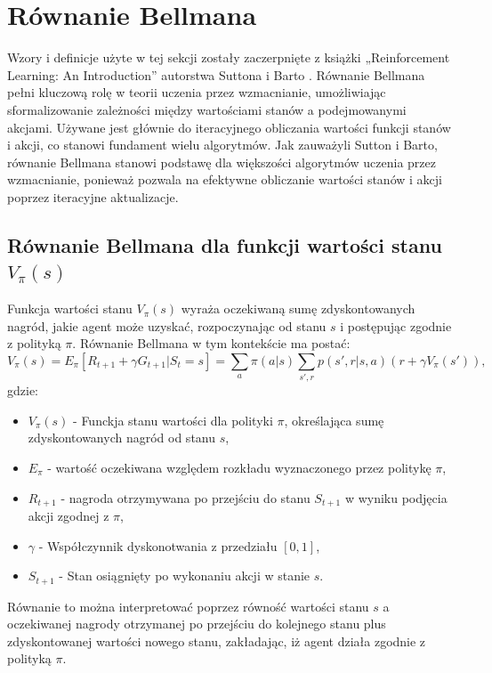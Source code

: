 \documentclass[a4paper, 12pt]{article}
\numberwithin{equation}{section}
\begin{document}
    \section{Równanie Bellmana}
    Wzory i definicje użyte w tej sekcji zostały zaczerpnięte z książki „Reinforcement Learning: An Introduction” autorstwa Suttona i Barto \cite{sutton2018rl}.
    Równanie Bellmana pełni kluczową rolę w teorii uczenia przez wzmacnianie, umożliwiając sformalizowanie zależności między wartościami stanów a podejmowanymi akcjami.
    Używane jest głównie do iteracyjnego obliczania wartości funkcji stanów i akcji, co stanowi fundament wielu algorytmów. 
    Jak zauważyli Sutton i Barto, równanie Bellmana stanowi podstawę dla większości algorytmów uczenia przez wzmacnianie, ponieważ pozwala na efektywne obliczanie wartości stanów i akcji poprzez iteracyjne aktualizacje.
    \subsection{Równanie Bellmana dla funkcji wartości stanu \( V_\pi(s) \)}
    Funkcja wartości stanu \( V_\pi(s) \) wyraża oczekiwaną sumę zdyskontowanych nagród, jakie agent może uzyskać, rozpoczynając od stanu \( s \) i postępując zgodnie z polityką \( \pi \). 
    Równanie Bellmana w tym kontekście ma postać:
    \begin{equation}
    V_\pi(s) = E_\pi[R_{t+1} + \gamma G_{t+1}|S_t = s] = \sum_{a} \pi(a|s) \sum_{s',r} p(s',r|s,a) (r + \gamma V_\pi(s')),
    \end{equation}
    gdzie:
    \begin{itemize}
        \item \( V_\pi(s) \) - Funckja stanu wartości dla polityki \( \pi \), określająca sumę zdyskontowanych nagród od stanu \( s \),
        \item \( E_\pi \) - wartość oczekiwana względem rozkładu wyznaczonego przez politykę \( \pi \),
        \item \( R_{t+1} \) - nagroda otrzymywana po przejściu do stanu \( S_{t+1} \) w wyniku podjęcia akcji zgodnej z \( \pi \), 
        \item \( \gamma \) - Współczynnik dyskonotwania z przedziału \( [0,1] \),
        \item \( S_{t+1} \) - Stan osiągnięty po wykonaniu akcji w stanie \( s \).
    \end{itemize}
    Równanie to można interpretować poprzez równość wartości stanu \( s \) a oczekiwanej nagrody otrzymanej po przejściu do kolejnego stanu plus zdyskontowanej wartości nowego stanu,
    zakładając, iż agent działa zgodnie z polityką \( \pi \).
\end{document}
